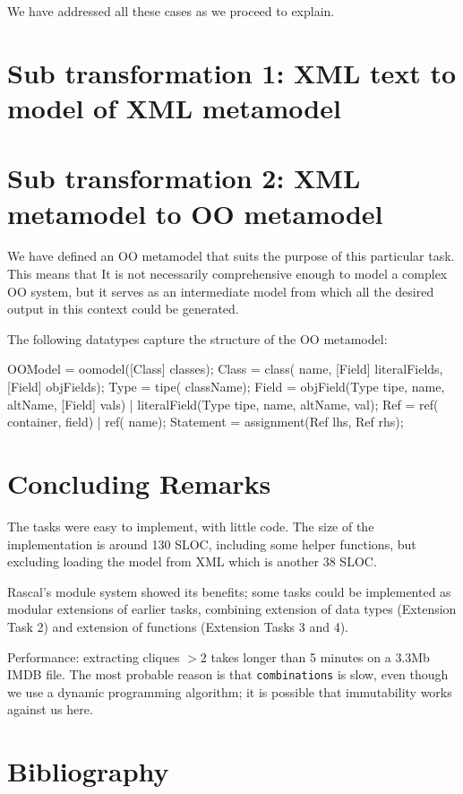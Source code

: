 \documentclass[submission,copyright,creativecommons]{eptcs}
\begin{document}
We have addressed all these cases as we proceed to explain.

\section{Sub transformation 1: XML text to model of XML metamodel}


\section{Sub transformation 2: XML metamodel to OO metamodel}

We have defined an OO metamodel that suits the purpose of this particular task. This means that It is not necessarily comprehensive enough to model a complex OO system, but it serves as an intermediate model from which all the desired output in this context could be generated. 

The following datatypes capture the structure of the OO metamodel:
\begin{rascal}
 OOModel = oomodel([Class] classes);
 Class = class( name, [Field] literalFields, [Field] objFields);
 Type = tipe( className);
 Field = objField(Type tipe,  name,  altName, [Field] vals) 
           | literalField(Type tipe,  name,  altName,  val);
 Ref = ref( container,  field) | ref( name);
 Statement = assignment(Ref lhs, Ref rhs);
\end{rascal}



\section{Concluding Remarks}

The tasks were easy to implement, with little code. The size of the
implementation is around 130 SLOC, including some helper functions,
but excluding loading the model from XML which is another 38 SLOC.

Rascal's module system showed its benefits; some tasks could be
implemented as modular extensions of earlier tasks, combining
extension of data types (Extension Task 2) and extension of functions
(Extension Tasks 3 and 4).

Performance: extracting cliques $> 2$ takes longer than 5 minutes on a
3.3Mb IMDB file. The most probable reason is that
\texttt{combinations} is slow, even though we use a dynamic
programming algorithm; it is possible that immutability works against
us here.

\section{Bibliography}

\nocite{*}


\end{document}
